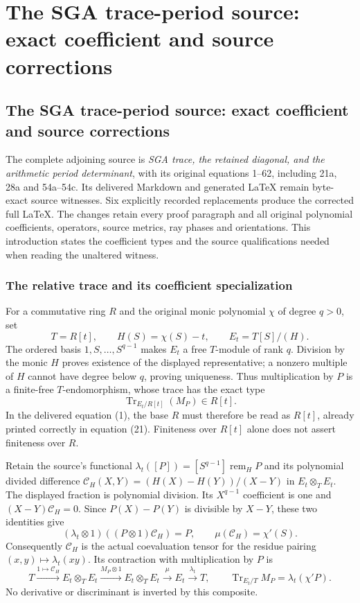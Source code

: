 \begingroup

\section{The SGA trace-period source: exact coefficient and source corrections}


\subsection{The SGA trace-period source: exact coefficient and source corrections}
\label{sec:sga-trace-period-source-corrections}

The complete adjoining source is \emph{SGA trace, the retained diagonal,
and the arithmetic period determinant}, with its original equations
1--62, including 21a, 28a and 54a--54c.  Its delivered Markdown and
generated LaTeX remain byte-exact source witnesses.  Six explicitly
recorded replacements produce the corrected full LaTeX.  The changes
retain every proof paragraph and all original polynomial coefficients,
operators, source metrics, ray phases and orientations.  This introduction
states the coefficient types and the source qualifications needed when
reading the unaltered witness.

\subsubsection{The relative trace and its coefficient specialization}

For a commutative ring $R$ and the original monic polynomial $\chi$ of
degree $q>0$, set
\[
 T=R[t],\qquad H(S)=\chi(S)-t,\qquad E_t=T[S]/(H).
 \tag{SGAC1}
\]
The ordered basis $1,S,\ldots,S^{q-1}$ makes $E_t$ a free
$T$-module of rank $q$.  Division by the monic $H$ proves existence
of the displayed representative; a nonzero multiple of $H$ cannot
have degree below $q$, proving uniqueness.  Thus multiplication by
$P$ is a finite-free $T$-endomorphism, whose trace has the exact type
\[
 \operatorname{Tr}_{E_t/R[t]}(M_P)\in R[t].
 \tag{SGAC2}
\]
In the delivered equation (1), the base $R$ must therefore be read as
$R[t]$, already printed correctly in equation (21).  Finiteness over
$R[t]$ alone does not assert finiteness over $R$.

Retain the source's functional
$\lambda_t([P])=[S^{q-1}]\operatorname{rem}_H P$ and its polynomial
divided difference $\mathcal C_H(X,Y)=(H(X)-H(Y))/(X-Y)$ in
$E_t\otimes_T E_t$.  The displayed fraction is polynomial division.
Its $X^{q-1}$ coefficient is one and
$(X-Y)\mathcal C_H=0$.  Since $P(X)-P(Y)$ is divisible by $X-Y$,
these two identities give
\[
 (\lambda_t\otimes1)((P\otimes1)\mathcal C_H)=P,
 \qquad \mu(\mathcal C_H)=\chi'(S).
 \tag{SGAC3}
\]
Consequently $\mathcal C_H$ is the actual coevaluation tensor for
the residue pairing $(x,y)\mapsto\lambda_t(xy)$.  Its contraction
with multiplication by $P$ is
\[
 T\xrightarrow{1\mapsto\mathcal C_H}E_t\otimes_T E_t
 \xrightarrow{M_P\otimes1}E_t\otimes_T E_t
 \xrightarrow{\mu}E_t\xrightarrow{\lambda_t}T,
 \qquad
 \operatorname{Tr}_{E_t/T}M_P=\lambda_t(\chi'P).
 \tag{SGAC4}
\]
No derivative or discriminant is inverted by this composite.

